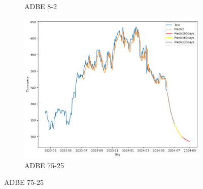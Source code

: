 \documentclass{ieeeojies}
\begin{document}
\begin{figure}[H]
\begin{subfigure}[h]{0.33\linewidth}
        \caption{ADBE 8-2}
        \label{fig:adbe-8-2}
    \end{subfigure}%
    \hfill
    \begin{subfigure}[h]{0.33\linewidth}
        \centering
        \includegraphics[width=\linewidth]{LSTM Plot/ADBE_LSTM_75_25.png}
        \caption{ADBE 75-25}
        \label{fig:adbe-75-25}
    \end{subfigure}
\end{figure}
 \vspace{-20pt}
\end{document}
